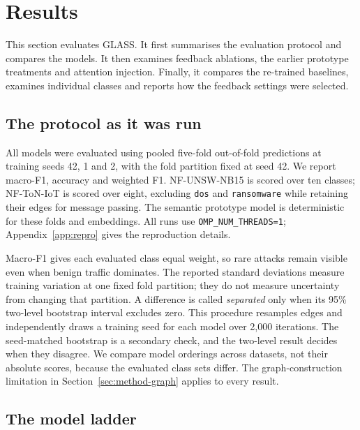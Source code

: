\section{Results}
\label{sec:results}

This section evaluates GLASS. It first summarises the evaluation protocol and compares the models. It then examines feedback ablations, the earlier prototype treatments and attention injection. Finally, it compares the re-trained baselines, examines individual classes and reports how the feedback settings were selected.

\FloatBarrier
\subsection{The protocol as it was run}
\label{sec:res-protocol}

All models were evaluated using pooled five-fold out-of-fold predictions at training seeds 42, 1 and 2, with the fold partition fixed at seed 42. We report macro-F1, accuracy and weighted F1. NF-UNSW-NB15 is scored over ten classes; NF-ToN-IoT is scored over eight, excluding \texttt{dos} and \texttt{ransomware} while retaining their edges for message passing. The semantic prototype model is deterministic for these folds and embeddings. All runs use \texttt{OMP\_NUM\_THREADS=1}; Appendix~\ref{app:repro} gives the reproduction details.

Macro-F1 gives each evaluated class equal weight, so rare attacks remain visible even when benign traffic dominates. The reported standard deviations measure training variation at one fixed fold partition; they do not measure uncertainty from changing that partition. A difference is called \emph{separated} only when its 95\% two-level bootstrap interval excludes zero. This procedure resamples edges and independently draws a training seed for each model over 2{,}000 iterations. The seed-matched bootstrap is a secondary check, and the two-level result decides when they disagree. We compare model orderings across datasets, not their absolute scores, because the evaluated class sets differ. The graph-construction limitation in Section~\ref{sec:method-graph} applies to every result.



\FloatBarrier
\subsection{The model ladder}
\label{sec:res-ladder}

